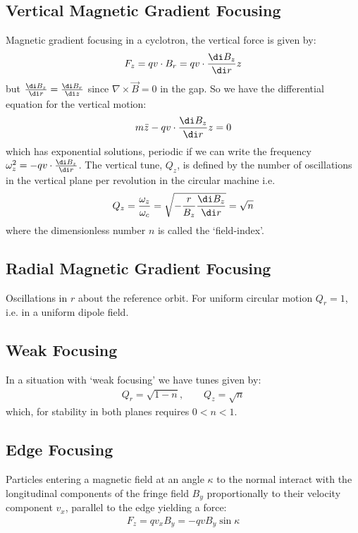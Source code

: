 \documentclass{article}
\numberwithin{equation}{section}
\begin{document}
\subsection{Vertical Magnetic Gradient Focusing}
Magnetic gradient focusing in a cyclotron, the vertical force is given by:
\begin{align}
F_z = q v \cdot B_r = q v \cdot \frac{\di B_z}{\di r} z
\end{align}
but $\frac{\di B_z}{\di r} = \frac{\di B_r}{\di z}$ since $\nabla \times \vec{B} = 0$ in the gap. So we have the differential equation for the vertical motion:
\begin{align}
m \ddot{z} - q v \cdot \frac{\di B_z}{\di r}z = 0
\end{align}
which has exponential solutions, periodic if we can write the frequency $\omega_z^2 = -qv \cdot \frac{\di B_z}{\di r}$.
The vertical tune, $Q_z$, is defined by the number of oscillations in the vertical plane per revolution in the circular machine i.e.
\begin{align}
Q_z = \frac{\omega_z}{\omega_c} = \sqrt{-\frac{r}{B_z} \frac{\di B_z}{\di r}} = \sqrt{n}
\end{align}
where the dimensionless number $n$ is called the `field-index'.

\subsection{Radial Magnetic Gradient Focusing}

Oscillations in $r$ about the reference orbit. For uniform circular motion $Q_r = 1$, i.e. in a uniform dipole field. 

\subsection{Weak Focusing}
In a situation with `weak focusing' we have tunes given by:
\begin{align}
Q_r = \sqrt{1-n}, \qquad Q_z = \sqrt{n}
\end{align}
which, for stability in both planes requires $0< n < 1$.

\subsection{Edge Focusing}
Particles entering a magnetic field at an angle $\kappa$ to the normal interact with the longitudinal components of the fringe field $B_y$ proportionally to their velocity component $v_x$, parallel to the edge yielding a force:
\begin{align}
F_z = q v_x B_y = -qvB_y \sin \kappa
\end{align}
\end{document}
